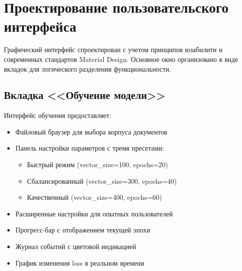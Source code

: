 \section{Проектирование пользовательского интерфейса}

Графический интерфейс спроектирован с учетом принципов юзабилити и современных стандартов Material Design. Основное окно организовано в виде вкладок для логического разделения функциональности.

\subsection{Вкладка <<Обучение модели>>}

Интерфейс обучения предоставляет:
\begin{itemize}
	\item Файловый браузер для выбора корпуса документов
	\item Панель настройки параметров с тремя пресетами:
	\begin{itemize}
		\item Быстрый режим (vector\_size=100, epochs=20)
		\item Сбалансированный (vector\_size=300, epochs=40)
		\item Качественный (vector\_size=400, epochs=60)
	\end{itemize}
	\item Расширенные настройки для опытных пользователей
	\item Прогресс-бар с отображением текущей эпохи
	\item Журнал событий с цветовой индикацией
	\item График изменения loss в реальном времени
\end{itemize}


